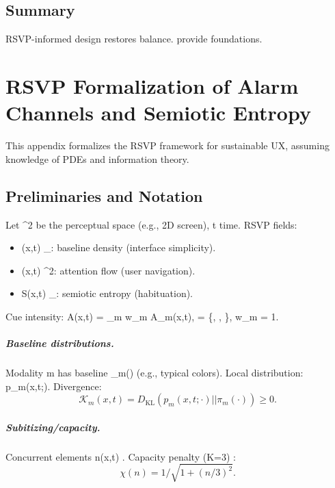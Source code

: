 \documentclass[openany]{book}
\begin{document}
\section{Summary}
RSVP-informed design restores balance.  provide foundations.

\appendix

\chapter{RSVP Formalization of Alarm Channels and Semiotic Entropy}
\label{app:rsvp}

This appendix formalizes the RSVP framework for sustainable UX, assuming knowledge of PDEs and information theory.

\section{Preliminaries and Notation}
\label{sec:rsvp-prelim}
Let \Omega \subset {}^2 be the perceptual space (e.g., 2D screen), t  time. RSVP fields:
\begin{itemize}
  \item \Phi(x,t) \in {}_{}: baseline density (interface simplicity).
  \item {}(x,t) \in {}^2: attention flow (user navigation).
  \item S(x,t) \in {}_{}: semiotic entropy (habituation).
\end{itemize}
Cue intensity: A(x,t) = \sum_{m \in {}} w_m A_m(x,t),  = \{, , \}, w_m = 1.

\paragraph{Baseline distributions.}
Modality m has baseline \pi_m(\xi) (e.g., typical colors). Local distribution: p_m(x,t;\xi). Divergence:
\begin{equation}
\label{eq:KL}
\mathcal{K}_m(x,t) = D_{\mathrm{KL}}(p_m(x,t;\cdot) || \pi_m(\cdot)) \geq 0.
\end{equation}

\paragraph{Subitizing/capacity.}
Concurrent elements n(x,t) \in {}. Capacity penalty (K=3) \citep{kaufman1949}:
\begin{equation}
\label{eq:capacity}
\chi(n) = 1 / \sqrt{1 + (n/3)^2}.
\end{equation}
\end{document}
